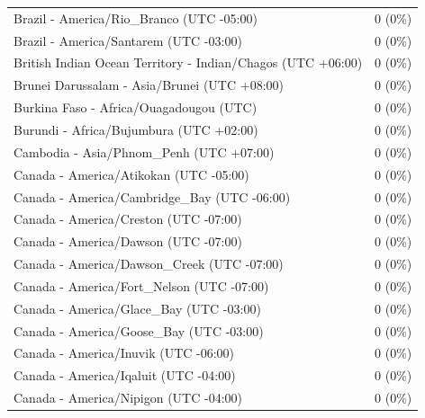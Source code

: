 \begin{appendix}
\begin{table}
{\begin{tabular}[t]{ll}
\hspace{1em}Brazil - America/Rio\_Branco (UTC -05:00) & 0 (0\%)\\
\hspace{1em}Brazil - America/Santarem (UTC -03:00) & 0 (0\%)\\
\hspace{1em}British Indian Ocean Territory - Indian/Chagos (UTC +06:00) & 0 (0\%)\\
\hspace{1em}Brunei Darussalam - Asia/Brunei (UTC +08:00) & 0 (0\%)\\
\addlinespace
\hspace{1em}Burkina Faso - Africa/Ouagadougou (UTC) & 0 (0\%)\\
\hspace{1em}Burundi - Africa/Bujumbura (UTC +02:00) & 0 (0\%)\\
\hspace{1em}Cambodia - Asia/Phnom\_Penh (UTC +07:00) & 0 (0\%)\\
\hspace{1em}Canada - America/Atikokan (UTC -05:00) & 0 (0\%)\\
\hspace{1em}Canada - America/Cambridge\_Bay (UTC -06:00) & 0 (0\%)\\
\addlinespace
\hspace{1em}Canada - America/Creston (UTC -07:00) & 0 (0\%)\\
\hspace{1em}Canada - America/Dawson (UTC -07:00) & 0 (0\%)\\
\hspace{1em}Canada - America/Dawson\_Creek (UTC -07:00) & 0 (0\%)\\
\hspace{1em}Canada - America/Fort\_Nelson (UTC -07:00) & 0 (0\%)\\
\hspace{1em}Canada - America/Glace\_Bay (UTC -03:00) & 0 (0\%)\\
\addlinespace
\hspace{1em}Canada - America/Goose\_Bay (UTC -03:00) & 0 (0\%)\\
\hspace{1em}Canada - America/Inuvik (UTC -06:00) & 0 (0\%)\\
\hspace{1em}Canada - America/Iqaluit (UTC -04:00) & 0 (0\%)\\
\hspace{1em}Canada - America/Nipigon (UTC -04:00) & 0 (0\%)\\

\end{tabular}}
\end{table}
\end{appendix}
